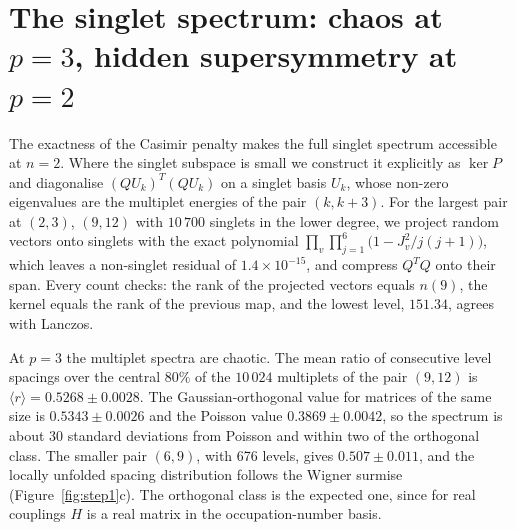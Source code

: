 \documentclass[10pt]{article}
\begin{document}
\section{\texorpdfstring{The singlet spectrum: chaos at $p=3$, hidden supersymmetry at $p=2$}{The singlet spectrum: chaos at p=3, hidden supersymmetry at p=2}}\label{sec:spectrum}

The exactness of the Casimir penalty makes the full singlet spectrum accessible at $n=2$. Where the singlet
subspace is small we construct it explicitly as $\ker P$ and diagonalise $(QU_k)^T(QU_k)$ on a singlet basis $U_k$,
whose non-zero eigenvalues are the multiplet energies of the pair $(k,k+3)$. For the largest pair at $(2,3)$,
$(9,12)$ with $10\,700$ singlets in the lower degree, we project random vectors onto singlets with the exact
polynomial $\prod_v\prod_{j=1}^{6}\big(1-J_v^2/j(j+1)\big)$, which leaves a non-singlet residual of
$1.4\times10^{-15}$, and compress $Q^TQ$ onto their span. Every count checks: the rank of the projected vectors equals
$n(9)$, the kernel equals the rank of the previous map, and the lowest level, $151.34$, agrees with Lanczos.

At $p=3$ the multiplet spectra are chaotic. The mean ratio of consecutive level spacings over the central $80\%$
of the $10\,024$ multiplets of the pair $(9,12)$ is $\langle r\rangle=0.5268\pm0.0028$. The Gaussian-orthogonal value
for matrices of the same size is $0.5343\pm0.0026$ and the Poisson value $0.3869\pm0.0042$, so the spectrum is about
30 standard deviations from Poisson and within two of the orthogonal class. The smaller pair $(6,9)$, with 676
levels, gives $0.507\pm0.011$, and the locally unfolded spacing distribution follows the Wigner surmise
(Figure~\ref{fig:step1}c). The orthogonal class is the expected one, since for real couplings $H$ is a real matrix in
the occupation-number basis.
\end{document}
